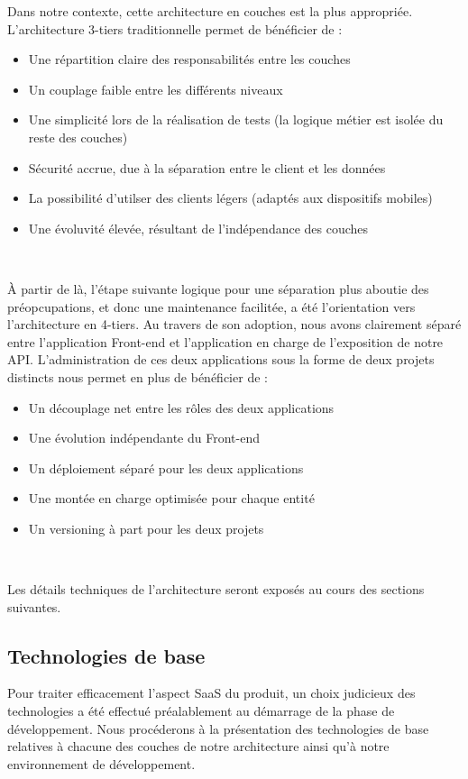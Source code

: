 \begin{spacing}{1.5}
Dans notre contexte, cette architecture en couches est la plus appropriée. L'architecture 3-tiers traditionnelle permet de bénéficier de :
\begin{itemize}
    \item Une répartition claire des responsabilités entre les couches
    \item Un couplage faible entre les différents niveaux
    \item Une simplicité lors de la réalisation de tests (la logique métier est isolée du reste des couches)
    \item Sécurité accrue, due à la séparation entre le client et les données
    \item La possibilité d'utilser des clients légers (adaptés aux dispositifs mobiles)
    \item Une évoluvité élevée, résultant de l'indépendance des couches
\end{itemize}
\

À partir de là, l'étape suivante logique pour une séparation plus aboutie des préopcupations, et donc une maintenance facilitée, a été l'orientation vers l'architecture en 4-tiers. Au travers de son adoption, nous avons clairement séparé entre l'application Front-end et l'application en charge de l'exposition de notre API. L'administration de ces deux applications sous la forme de deux projets distincts nous permet en plus de bénéficier de :
\begin{itemize}
    \item Un découplage net entre les rôles des deux applications
    \item Une évolution indépendante du Front-end
    \item Un déploiement séparé pour les deux applications
    \item Une montée en charge optimisée pour chaque entité
    \item Un versioning à part pour les deux projets
\end{itemize}
\

Les détails techniques de l'architecture seront exposés au cours des sections suivantes.

\subsection{Technologies de base}
Pour traiter efficacement l'aspect SaaS du produit, un choix judicieux des technologies a été effectué préalablement au démarrage de la phase de développement. Nous procéderons à la présentation des technologies de base relatives à chacune des couches de notre architecture ainsi qu'à notre environnement de développement.


\end{spacing}

